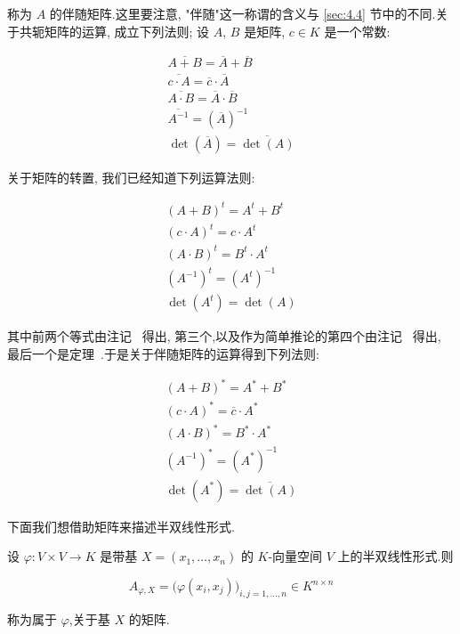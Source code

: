 称为 $A$ 的伴随矩阵.这里要注意, "伴随"这一称谓的含义与 \ref{sec:4.4} 节中的不同.关于共轭矩阵的运算, 成立下列法则; 设 $A$, $B$ 是矩阵, $c \in K$ 是一个常数:

\[
\begin{array}{c}
\overline{A + B} = \overline{A} + \overline{B} \\
\overline{c \cdot A} = \overline{c} \cdot \overline{A} \\
\overline{A \cdot B} = \overline{A} \cdot \overline{B} \\
\overline{A^{-1}} = (\overline{A})^{-1} \\
\det(\overline{A}) = \overline{\det(A)}
\end{array}
\]

关于矩阵的转置, 我们已经知道下列运算法则:

\[
\begin{array}{c}
(A + B)^{t} = A^{t} + B^{t} \\
(c \cdot A)^{t} = c \cdot A^{t} \\
(A \cdot B)^{t} = B^{t} \cdot A^{t} \\
(A^{-1})^{t} = (A^{t})^{-1} \\
\det(A^{t}) = \det(A)
\end{array}
\]

其中前两个等式由注记~ 得出, 第三个,以及作为简单推论的第四个由注记~ 得出, 最后一个是定理~.于是关于伴随矩阵的运算得到下列法则:

\[
\begin{array}{c}
(A + B)^{*} = A^{*} + B^{*} \\
(c \cdot A)^{*} = \overline{c} \cdot A^{*} \\
(A \cdot B)^{*} = B^{*} \cdot A^{*} \\
(A^{-1})^{*} = (A^{*})^{-1} \\
\det(A^{*}) = \overline{\det(A)}
\end{array}
\]

下面我们想借助矩阵来描述半双线性形式.

\begin{definition}[半双线性形式的矩阵]\label{def:7.3.1}
设 $\varphi \colon V \times V \longrightarrow K$ 是带基 $X = (x_1, \ldots, x_n)$ 的 $K$-向量空间 $V$ 上的半双线性形式.则

\[
A_{\varphi, X} = \bigl(\varphi(x_i, x_j)\bigr)_{i, j = 1, \ldots, n} \in K^{n \times n}
\]

称为属于 $\varphi$,关于基 $X$ 的矩阵.
\end{definition}

